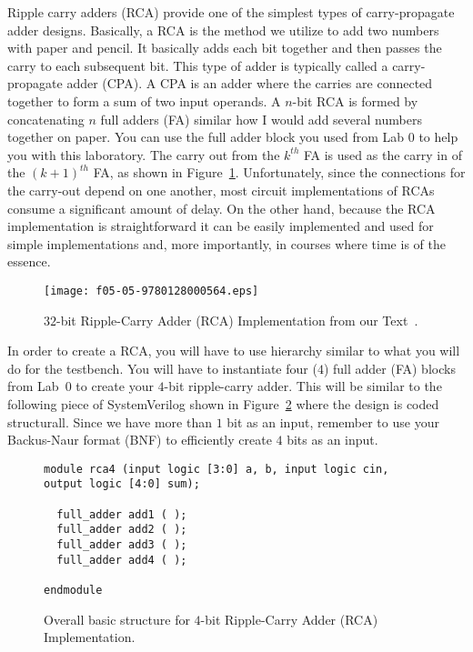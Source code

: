 \documentclass{article}
\begin{document}
Ripple carry adders (RCA) provide one of the simplest types of
carry-propagate adder designs.  Basically, a RCA is the method we
utilize to add two numbers
with paper and pencil.  It basically adds each bit together and then
passes the carry to each subsequent bit.  This type  of adder
is typically called a carry-propagate adder (CPA).
A CPA is an adder
where the carries are connected together to form a sum of two input
operands.
A $n$-bit RCA is formed by concatenating $n$ full adders (FA) similar
how I would add several numbers together on paper.  You
can use the full adder block you used from Lab 0 to help you with this
laboratory.  
The carry out from the $k^{th}$ FA is used as the carry in of 
the $(k + 1)^{th}$ FA, as shown in Figure~\ref{rca.fig}.  
Unfortunately, since 
the connections for the carry-out depend on one another, 
most circuit implementations of RCAs
consume a significant amount of delay.  On the other hand, 
because the RCA implementation is straightforward
it can be easily implemented and
used for simple implementations and, more importantly, in courses
where time is of the essence.
\begin{figure} [tb]
\begin{center}
\texttt{[image: f05-05-9780128000564.eps]}
\end{center}
\caption{$32$-bit Ripple-Carry Adder (RCA) Implementation from our Text~\cite{ddca-riscv}.}
\label{rca.fig}
\end{figure}

In order to create a RCA, you will have to use hierarchy similar to
what you will do for the testbench.  You will have to instantiate four
($4$) full adder (FA) blocks from Lab~$0$ to create your $4$-bit
ripple-carry adder.  This will be similar to the following piece of
SystemVerilog shown in Figure~\ref{rca4_sv.fig}
where the design is coded structurall.
Since we have more than $1$ bit as an input, remember to use your
Backus-Naur format (BNF) to efficiently create $4$ bits as an input.
\begin{figure}
\begin{verbatim}
module rca4 (input logic [3:0] a, b, input logic cin, output logic [4:0] sum);

  full_adder add1 ( );
  full_adder add2 ( );
  full_adder add3 ( );
  full_adder add4 ( );

endmodule
\end{verbatim}
\caption{Overall basic structure for $4$-bit Ripple-Carry Adder (RCA) Implementation.}
\label{rca4_sv.fig}
\end{figure}
\end{document}
